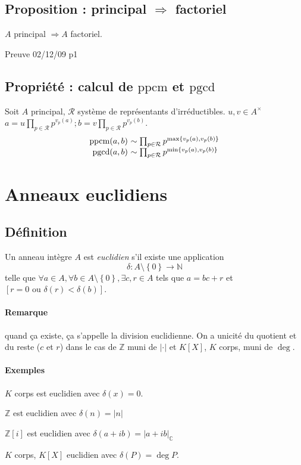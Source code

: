 \documentclass[reqno,a4paper,10pt]{report}
\makeatletter
\newcommand{\set}[1]{\left\lbrace #1 \right\rbrace} %
\newcommand{\IZ}{\ensuremath{\mathbb{Z}}\xspace} %
\newcommand{\IN}{\ensuremath{\mathbb{N}}\xspace} %
\newcommand{\IC}{\ensuremath{\mathbb{C}}\xspace} %
\newcommand{\so}{\Rightarrow}
\newcommand{\pgcd}{\mathrm{pgcd}} %
\newcommand{\ppcm}{\mathrm{ppcm}}
\newcommand{\ou}{\text{ ou }}
\let\olditemize=\itemize%
\renewenvironment{itemize}{%
    \olditemize%
  }{%
    \@noparlisttrue%
    \endlist%
  }%
\makeatother
\begin{document}
\subsection{Proposition : principal $\so$ factoriel}
$A$ principal $\so A$ factoriel.

  Preuve 02/12/09 p1

\subsection{Propriété : calcul de $\ppcm$ et $\pgcd$}
Soit $A$ principal, $\mathcal R$ système de représentants d'irréductibles.
$u,v\in A^\times$\\
$\displaystyle a=u\prod_{p\in \mathcal R} p^{v_p(a)}; b=v\prod_{p\in \mathcal
R} p^{v_p(b)}$.
\[
\begin{array}{r@{\ }l}
  \ppcm(a,b) &\sim \prod_{p\in \mathcal R} p^{\max\set{v_p(a), v_p(b)}}\\
  \pgcd(a,b) &\sim \prod_{p\in \mathcal R} p^{\min\set{v_p(a), v_p(b)}}
\end{array}
\]

\section{Anneaux euclidiens}
\subsection{Définition}
Un anneau intègre $A$ est \emph{euclidien} s'il existe une application
\[\delta : A\setminus\set{0} \to \IN\]
telle que $\forall a\in A, \forall b \in A\setminus\set{0}, \exists c,r \in A$
tels que $a=bc+r$ et $\left[ r=0 \ou \delta(r) <\delta(b) \right]$.

\paragraph{Remarque}
quand ça existe, ça s'appelle la division euclidienne. On a unicité du
quotient et du reste ($c$ et $r$) dans le cas de $\IZ$ muni de $|\cdot|$
et $K[X]$, $K$ corps, muni de $\deg$.

\paragraph{Exemples}
\begin{itemize}
  \item $K$ corps est euclidien avec $\delta(x) = 0$.
  \item $\IZ$ est euclidien avec $\delta(n)=|n|$
  \item $\IZ[i]$ est euclidien avec $\delta(a+ib)=|a+ib|_{\IC}$
  \item $K$ corps, $K[X]$ euclidien avec $\delta(P)=\deg P$.
\end{itemize}
\end{document}
